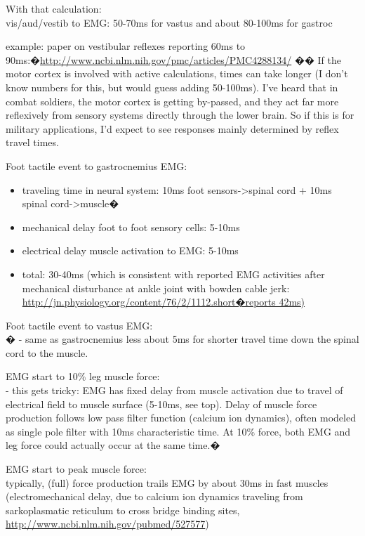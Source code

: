 \documentclass[letterpaper,12pt,fullpage]{article}
\begin{document}
With that calculation:\\
vis/aud/vestib to EMG: 50-70ms for vastus and about 80-100ms for
gastroc

example: paper on vestibular reflexes reporting 60ms to
90ms:�\url{http://www.ncbi.nlm.nih.gov/pmc/articles/PMC4288134/}
��
If the motor cortex is involved with active calculations, times can
take longer (I don't know numbers for this, but would guess adding
50-100ms). I've heard that in combat soldiers, the motor cortex is
getting by-passed, and they act far more reflexively from sensory
systems directly through the lower brain. So if this is for military
applications, I'd expect to see responses mainly determined by
reflex travel times.

Foot tactile event to gastrocnemius EMG:
\begin{itemize}
\item
traveling time in neural system: 10ms foot sensors->spinal cord +
10ms spinal cord->muscle�
\item
mechanical delay foot to foot sensory cells: 5-10ms
\item
electrical delay muscle activation to EMG: 5-10ms
\item
total: 30-40ms (which is consistent with reported EMG activities
after mechanical disturbance at ankle joint with bowden cable jerk:
\url{http://jn.physiology.org/content/76/2/1112.short�reports 42ms)}
\end{itemize}

Foot tactile event to vastus EMG:\\�
- same as gastrocnemius less about 5ms for shorter travel time down
the spinal cord to the muscle.

EMG start to 10\% leg muscle force:\\
- this gets tricky: EMG has fixed delay from muscle activation due to
travel of electrical field to muscle surface (5-10ms, see top). Delay
of muscle force production follows low pass filter function (calcium
ion dynamics), often modeled as single pole filter with 10ms
characteristic time. At 10\% force, both EMG and leg force could
actually occur at the same time.�

EMG start to peak muscle force:\\
typically, (full) force production trails EMG by about 30ms in fast
muscles (electromechanical delay, due to calcium ion dynamics
traveling from sarkoplasmatic reticulum to cross bridge binding
sites, \url{http://www.ncbi.nlm.nih.gov/pubmed/527577})
\end{document}
